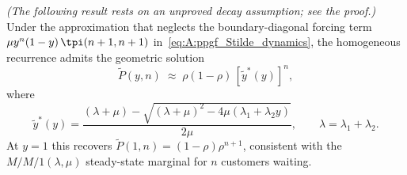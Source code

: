 \begin{theorem}\label{thm:A:PPGF_Stilde}
    \emph{(The following result rests on an unproved decay assumption; see the proof.)}
    Under the approximation that neglects the boundary-diagonal forcing term
    $\mu y^n(1-y)\,\tpi(n+1,n+1)$ in~\eqref{eq:A:ppgf_Stilde_dynamics}, the
    homogeneous recurrence admits the geometric solution
    \begin{equation}
        \widetilde{P}(y,n) \;\approx\; \rho(1-\rho)\,[\widetilde{y}^*(y)]^n, \label{eq:A:Ptilde_approx}
    \end{equation}
    where
    \begin{equation}
        \widetilde{y}^*(y) = \frac{(\lambda+\mu) - \sqrt{(\lambda+\mu)^2 - 4\mu(\lambda_1+\lambda_2 y)}}{2\mu}, \qquad \lambda = \lambda_1+\lambda_2. \label{eq:A:ytildestar}
    \end{equation}
    At $y=1$ this recovers $\widetilde{P}(1,n)=(1-\rho)\rho^{n+1}$, consistent with
    the $M/M/1(\lambda,\mu)$ steady-state marginal for $n$ customers waiting.
\end{theorem}

